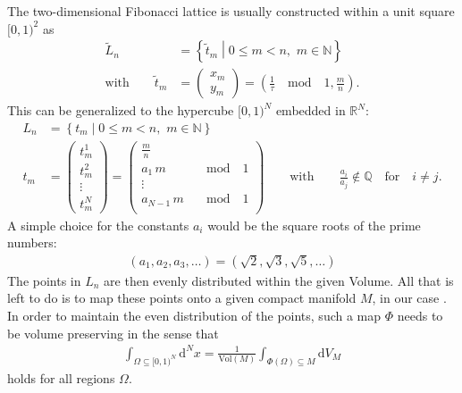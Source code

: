 \noindent The two-dimensional Fibonacci lattice is usually constructed within a unit square $[0,1)^2$ as
\begin{align*}
 \tilde{L}_n                      & = \left\{ \tilde{t}_m \middle| 0 \le m < n, \, \, m \in \mathbb{N} \right\}                                    \\
 \textrm{with} \qquad \tilde{t}_m & = \begin{pmatrix}x_m\\y_m\end{pmatrix} = \left(\frac{1}{\tau} \quad \mathrm{mod} \quad 1, \frac{m}{n} \right) \textrm{.}
\end{align*}
\noindent This can be generalized to the hypercube $[0,1)^N$ embedded in $\mathbb{R}^N$:
\begin{align*}
 L_n & = \left\{ t_m \middle| 0 \le m < n, \, \, m \in \mathbb{N} \right\}                                                                                       \\
 t_m & = \begin{pmatrix} t_m^1 \\ t_m^2 \\ \vdots \\ t_m^N \end{pmatrix} = \begin{pmatrix}
  \frac{m}{n}        &                      \\
  a_1 \, m \quad     & \mathrm{mod} \quad 1 \\
  \vdots             &                      \\
  a_{N-1} \, m \quad & \mathrm{mod} \quad 1 \\
 \end{pmatrix} \qquad \textrm{with} \qquad \frac{a_i}{a_j} \notin \mathbb{Q} \quad \textrm{for} \quad i \neq j \textrm{.}
\end{align*}
A simple choice for the constants $a_i$ would be the square roots of the prime numbers:
\begin{align*}
 (a_1, a_2 ,a_3, \dots) = (\sqrt{2}, \sqrt{3}, \sqrt{5}, \dots)
\end{align*}
The points in $L_n$ are then evenly distributed within the given Volume. All that is left to do is to map these points onto a given compact manifold $M$, in our case \SUTwo. In order to maintain the even distribution of the points, such a map $\Phi$ needs to be volume preserving in the sense that
\begin{align}
 \int_{\Omega \subseteq [0,1)^N} \mathrm{d}^N x = \frac{1}{\mathrm{Vol}(M)} \int_{\Phi(\Omega) \subseteq M} \mathrm{d}V_M
 \label{eq:fibAreaPres}
\end{align}
holds for all regions $\Omega$.

